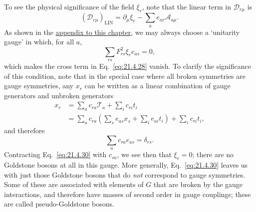 To see the physical significance of the field $\xi_r$, note that the linear term in $\mathcal D_{r\mu}$ is
\begin{equation}
(\mathcal D_{r\mu})_{\mathrm{LIN}}
=\partial_\mu\xi_r-\sum_a e_{a r}\mathcal A_{a\mu}.
\tag{21.4.29}\label{eq:21.4.29}
\end{equation}
As shown in the \hyperref[app:21.A]{appendix to this chapter}, we may always choose a `unitarity gauge' in which, for all $a$,
\begin{equation}
\sum_{rs}F_{rs}^2\xi_r e_{a s}=0,
\tag{21.4.30}\label{eq:21.4.30}
\end{equation}
which makes the cross term in Eq.~\eqref{eq:21.4.28} vanish. To clarify the significance of this condition, note that in the special case where all broken symmetries are gauge symmetries, any $x_r$ can be written as a linear combination of gauge generators and unbroken generators
\begin{align*}
x_r
&=\sum_a c_{ra}\mathcal T_a+\sum_i c_{ri}t_i
\\
&=\sum_a c_{ra}
\left(\sum_s e_{a s}x_s+\sum_i e_{a i}t_i\right)
+\sum_i c_{ri}t_i,
\end{align*}
and therefore
\[
\sum_a c_{ra}e_{a s}=\delta_{rs}.
\]
Contracting Eq.~\eqref{eq:21.4.30} with $c_{sa}$, we see then that $\xi_r=0$; there are no Goldstone bosons at all in this gauge. More generally, Eq.~\eqref{eq:21.4.30} leaves us with just those Goldstone bosons that do \emph{not} correspond to gauge symmetries. Some of these are associated with elements of $G$ that are broken by the gauge interactions, and therefore have masses of second order in gauge couplings; these are called pseudo-Goldstone bosons.

